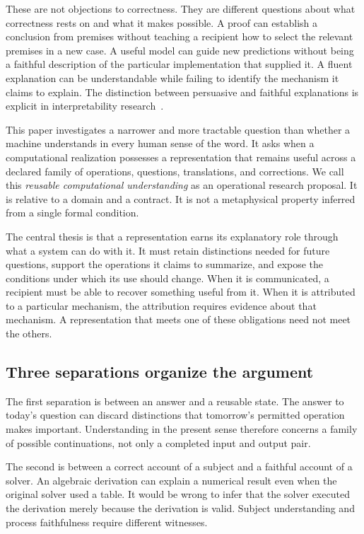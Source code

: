 \documentclass[11pt,letterpaper]{article}
\theoremstyle{plain}
\theoremstyle{definition}
\begin{document}
These are not objections to correctness. They are different questions about what correctness rests on and what it makes possible. A proof can establish a conclusion from premises without teaching a recipient how to select the relevant premises in a new case. A useful model can guide new predictions without being a faithful description of the particular implementation that supplied it. A fluent explanation can be understandable while failing to identify the mechanism it claims to explain. The distinction between persuasive and faithful explanations is explicit in interpretability research~\cite{jacovi}.

This paper investigates a narrower and more tractable question than whether a machine understands in every human sense of the word. It asks when a computational realization possesses a representation that remains useful across a declared family of operations, questions, translations, and corrections. We call this \emph{reusable computational understanding} as an operational research proposal. It is relative to a domain and a contract. It is not a metaphysical property inferred from a single formal condition.

The central thesis is that a representation earns its explanatory role through what a system can do with it. It must retain distinctions needed for future questions, support the operations it claims to summarize, and expose the conditions under which its use should change. When it is communicated, a recipient must be able to recover something useful from it. When it is attributed to a particular mechanism, the attribution requires evidence about that mechanism. A representation that meets one of these obligations need not meet the others.

\subsection{Three separations organize the argument}
The first separation is between an answer and a reusable state. The answer to today's question can discard distinctions that tomorrow's permitted operation makes important. Understanding in the present sense therefore concerns a family of possible continuations, not only a completed input and output pair.

The second is between a correct account of a subject and a faithful account of a solver. An algebraic derivation can explain a numerical result even when the original solver used a table. It would be wrong to infer that the solver executed the derivation merely because the derivation is valid. Subject understanding and process faithfulness require different witnesses.
\end{document}

